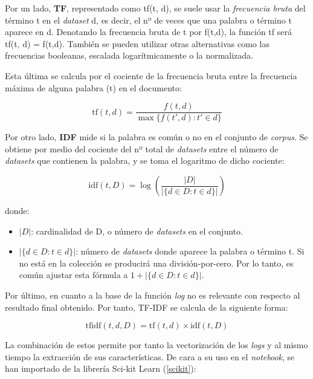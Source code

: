 Por un lado, \textbf{\gls{TF}}, representado como tf(t, d), se suele usar la \textit{frecuencia bruta} del término t en el \textit{dataset} d, es decir, el nº de veces que una palabra o término t aparece en d. Denotando la frecuencia bruta de t por f(t,d), la función tf será tf(t, d) = f(t,d). También se pueden utilizar otras alternativas como las frecuencias booleanas, escalada logarítmicamente o la normalizada. 

\newpage

Esta última se calcula por el cociente de la frecuencia bruta entre la frecuencia máxima de alguna palabra (t) en el documento:

\begin{equation}
    \text{tf}(t, d) = \frac{f(t, d)}{\max\{f(t', d) : t' \in d\}}
\end{equation}

Por otro lado, \textbf{\gls{IDF}} mide si la palabra es común o no en el conjunto de \textit{corpus}. Se obtiene por medio del cociente del nº total de \textit{datasets} entre el número de \textit{datasets} que contienen la palabra, y se toma el logaritmo de dicho cociente:

\begin{equation}
    \text{idf}(t, D) = \log \left( \frac{|D|}{|\{d \in D : t \in d\}|} \right)
\end{equation}

donde:

\begin{itemize}
    \item $|D|$: cardinalidad de D, o número de \textit{datasets} en el conjunto. \\
    \item $|\{d \in D : t \in d\}|$: número de \textit{datasets} donde aparece la palabra o término t. Si no está en la colección se producirá una división-por-cero. Por lo tanto, es común ajustar esta fórmula a $1 + |\{d \in D : t \in d\}|$.
\end{itemize}

Por último, en cuanto a la base de la función \textit{log} no es relevante con respecto al resultado final obtenido. Por tanto, \gls{TF}-\gls{IDF} se calcula de la siguiente forma:

\begin{equation}
    \text{tfidf}(t, d, D) = \text{tf}(t, d) \times \text{idf}(t, D)
\end{equation}

La combinación de estos permite por tanto la vectorización de los \textit{logs} y al mismo tiempo la extracción de sus características. De cara a su uso en el \textit{notebook}, se han importado de la librería Sci-kit Learn (\ref{scikit}):

